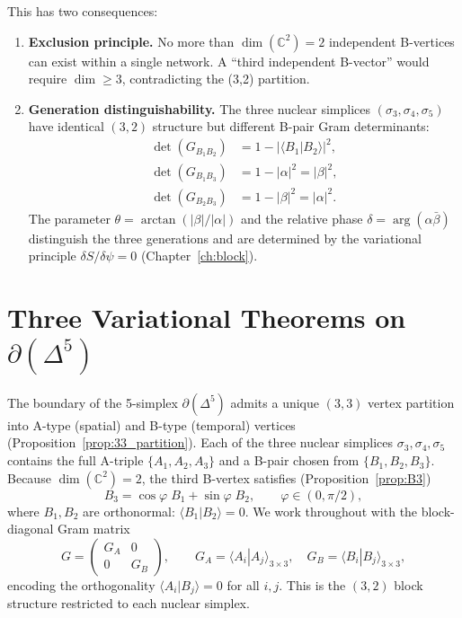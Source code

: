 \documentclass[12pt]{article}
\theoremstyle{remark}
\theoremstyle{definition}
\newcommand{\CC}{\mathbb{C}}
\begin{document}
This has two consequences:
\begin{enumerate}
\item \textbf{Exclusion principle.}  No more than $\dim(\mathbb{C}^2) = 2$ independent B-vertices can exist within a single network.  A ``third independent B-vector'' would require $\dim \geq 3$, contradicting the (3,2) partition.

\item \textbf{Generation distinguishability.}  The three nuclear simplices $(\sigma_3, \sigma_4, \sigma_5)$ have identical $(3,2)$ structure but different B-pair Gram determinants:
\begin{align}
\det(G_{B_1 B_2}) &= 1 - |\langle B_1 | B_2 \rangle|^2, \\
\det(G_{B_1 B_3}) &= 1 - |\alpha|^2 = |\beta|^2, \\
\det(G_{B_2 B_3}) &= 1 - |\beta|^2 = |\alpha|^2.
\end{align}
The parameter $\theta = \arctan(|\beta|/|\alpha|)$ and the relative phase $\delta = \arg(\alpha\bar\beta)$ distinguish the three generations and are determined by the variational principle $\delta S / \delta\psi = 0$ (Chapter~\ref{ch:block}).
\end{enumerate}



\section{Three Variational Theorems on $\partial(\Delta^5)$}
\label{ch:variational_theorems}

The boundary of the 5-simplex $\partial(\Delta^5)$ admits a unique
$(3,3)$ vertex partition into A-type (spatial) and B-type (temporal)
vertices (Proposition~\ref{prop:33_partition}).  Each of the three
nuclear simplices $\sigma_3, \sigma_4, \sigma_5$ contains the full
A-triple $\{A_1, A_2, A_3\}$ and a B-pair chosen from
$\{B_1, B_2, B_3\}$.  Because $\dim(\CC^2) = 2$, the third B-vertex
satisfies (Proposition~\ref{prop:B3})
\begin{equation}\label{eq:B3_parametrize}
B_3 = \cos\varphi\; B_1 + \sin\varphi\; B_2,
\qquad \varphi \in (0, \pi/2),
\end{equation}
where $B_1, B_2$ are orthonormal: $\langle B_1 | B_2 \rangle = 0$.
We work throughout with the block-diagonal Gram matrix
\begin{equation}\label{eq:block_gram}
G = \begin{pmatrix} G_A & 0 \\ 0 & G_B \end{pmatrix},
\qquad
G_A = \langle A_i | A_j \rangle_{3\times 3},
\quad
G_B = \langle B_i | B_j \rangle_{3\times 3},
\end{equation}
encoding the orthogonality $\langle A_i | B_j \rangle = 0$ for all
$i, j$.  This is the $(3,2)$ block structure restricted to each
nuclear simplex.
\end{document}

